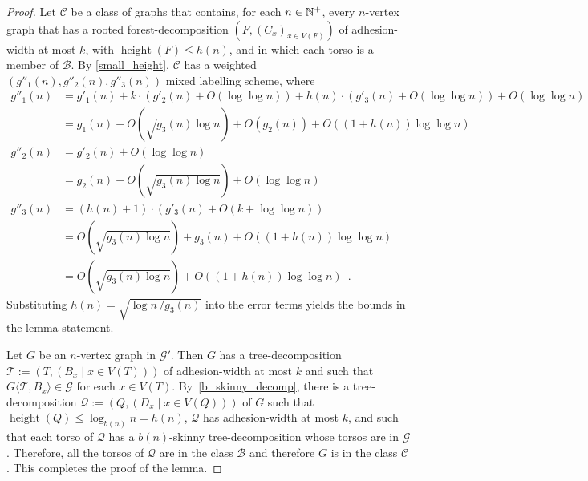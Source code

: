 \documentclass{patmorin}
\renewcommand{\le}{\leqslant}
\renewcommand{\leq}{\leqslant}
\newcommand{\torso}[2]{{#1}\langle{#2}\rangle}
\DeclareMathOperator{\height}{height}
\newcommand{\Oh}{O}
\begin{document}
\begin{proof}
  Let $\mathcal{C}$ be a class of graphs that contains, for each $n\in\mathbb{N}^+$,
  every $n$-vertex graph that has a rooted forest-decomposition $(F,(C_x)_{x\in V(F)})$
  of adhesion-width at most $k$, with $\height(F)\leq h(n)$, and
  in which each torso is a member of $\mathcal{B}$.
  By \cref{small_height}, $\mathcal{C}$ has a weighted \linebreak $(g''_1(n),g''_2(n),g''_3(n))$ mixed labelling scheme, where
  \begin{align*}
    g''_1(n)
     & = g'_1(n) + k\cdot(g'_2(n) + \Oh(\log\log n)) + h(n)\cdot (g'_3(n)+\Oh(\log\log n)) + \Oh(\log\log n) \\
     & = g_1(n) +  \Oh\left(\sqrt{g_3(n) \log n}\right) + \Oh(g_2(n)) + \Oh\left((1+h(n))\log\log n\right)   \\
    g''_2(n)
     & = g'_2(n) + \Oh(\log\log n)                                                                           \\
     & = g_2(n) + \Oh\left(\sqrt{{g_3(n)\log n}}\right) + \Oh(\log\log n)                                    \\
    g''_3(n)
     & = (h(n)+1)\cdot (g'_3(n)+\Oh(k+\log\log n))                                                           \\%
     & = \Oh\left(\sqrt{g_3(n)\log n}\right) + g_3(n) + \Oh\left((1+h(n))\log\log n\right)                   \\
     & = \Oh\left(\sqrt{g_3(n) \log n}\right) + \Oh\left((1+h(n))\log\log n\right)\enspace.
  \end{align*}
  Substituting $h(n) = \sqrt{\log n\, / g_3(n)}$ into the error terms yields the bounds in the lemma statement.

  Let $G$ be an $n$-vertex graph in $\mathcal{G}'$.
  Then $G$ has a tree-decomposition $\mathcal{T}:=(T,(B_x\mid x\in V(T)))$ of adhesion-width at most $k$ and such that $\torso{G}{\mathcal{T},B_x}\in\mathcal{G}$ for each $x\in V(T)$.
  By~\cref{b_skinny_decomp}, there is a tree-decomposition $\mathcal{Q}:=(Q,(D_x \mid x\in V(Q)))$ of $G$ such that $\height(Q)\le\log_{b(n)} n = h(n)$, $\mathcal{Q}$ has adhesion-width at most $k$, and such that each torso of $\mathcal{Q}$ has a $b(n)$-skinny tree-decomposition whose torsos are in $\mathcal{G}$.
  Therefore, all the torsos of $\mathcal{Q}$ are in the class $\mathcal{B}$ and therefore $G$ is in the class $\mathcal{C}$.  This completes the proof of the lemma.
\end{proof}
\end{document}
